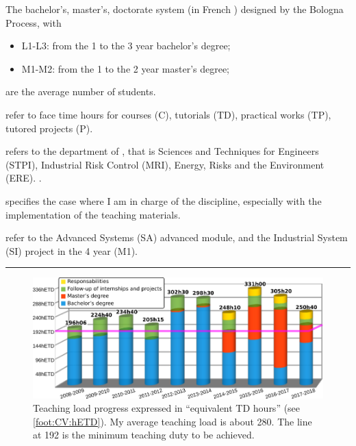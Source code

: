 \begin{table}[tb]
\begin{flushleft}\footnotesize\footnoterule
\begin{description}[format=\sffamily]
  \item[LMD] The bachelor's, master's, doctorate system (in French ) designed by the Bologna Process, with 
  \begin{itemize}
    \item L1-L3: from the 1 to the 3 year bachelor's degree;
    \item M1-M2: from the 1 to the 2 year master's degree;
  \end{itemize}
  \item[Students] are the average number of students.
  \item[C, TD, TP, P] refer to face time hours for courses (C), tutorials (TD), practical works (TP), tutored projects (P).
  \item[Dept.] refers to the department of \INSA \CVL, that is
  Sciences and Techniques for Engineers (STPI),
  Industrial Risk Control (MRI),
  Energy, Risks and the Environment (ERE). .
  \item[Resp.] specifies the case where I am in charge of the discipline, especially with the implementation of the teaching materials.
  \item[SA and SI projects] refer to the Advanced Systems (SA) advanced module, and the Industrial System (SI) project  in the 4 year (M1).
\end{description}
\hrule
\end{flushleft}
\end{table}
%
\begin{figure}[tbh]
  \centering
  \includegraphics{fig/appendixCV/teaching_charge} %
  \caption[Teaching load progress]{Teaching load progress expressed in \enquote{equivalent TD hours}  (see \autoref{foot:CV:hETD}).
   My average teaching load is about \SI{280}{\hETD}.
  The line at \SI{192}{\hETD} is the minimum  teaching duty to be achieved.}
  \label{fig:teaching_charge}
\end{figure}


